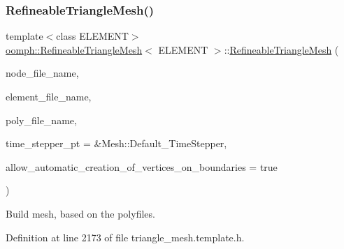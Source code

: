 \subsubsection{\texorpdfstring{Refineable\+Triangle\+Mesh()}{RefineableTriangleMesh()}\hspace{0.1cm}{\footnotesize\ttfamily [2/3]}}
{\footnotesize\ttfamily template$<$class E\+L\+E\+M\+E\+NT$>$ \\
\hyperlink{classoomph_1_1RefineableTriangleMesh}{oomph\+::\+Refineable\+Triangle\+Mesh}$<$ E\+L\+E\+M\+E\+NT $>$\+::\hyperlink{classoomph_1_1RefineableTriangleMesh}{Refineable\+Triangle\+Mesh} (\begin{DoxyParamCaption}\item[{const std\+::string \&}]{node\+\_\+file\+\_\+name,  }\item[{const std\+::string \&}]{element\+\_\+file\+\_\+name,  }\item[{const std\+::string \&}]{poly\+\_\+file\+\_\+name,  }\item[{Time\+Stepper $\ast$}]{time\+\_\+stepper\+\_\+pt = {\ttfamily \&Mesh\+:\+:Default\+\_\+TimeStepper},  }\item[{const bool \&}]{allow\+\_\+automatic\+\_\+creation\+\_\+of\+\_\+vertices\+\_\+on\+\_\+boundaries = {\ttfamily true} }\end{DoxyParamCaption})\hspace{0.3cm}{\ttfamily [inline]}}



Build mesh, based on the polyfiles. 



Definition at line 2173 of file triangle\+\_\+mesh.\+template.\+h.

\mbox{\label{classoomph_1_1RefineableTriangleMesh_a488004263be96473c332468e13e80a83}} 
